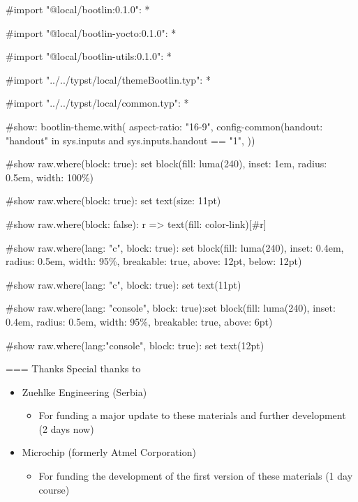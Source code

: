 #import "@local/bootlin:0.1.0": *

#import "@local/bootlin-yocto:0.1.0": *

#import "@local/bootlin-utils:0.1.0": *

#import "../../typst/local/themeBootlin.typ": *

#import "../../typst/local/common.typ": *

#show: bootlin-theme.with( aspect-ratio: "16-9", config-common(handout: "handout" in sys.inputs and sys.inputs.handout == "1", ))

#show raw.where(block: true): set block(fill: luma(240), inset: 1em, radius: 0.5em, width: 100\%)

#show raw.where(block: true): set text(size: 11pt)

#show raw.where(block: false): r => text(fill: color-link)[#r]

#show raw.where(lang: "c", block: true): set block(fill: luma(240), inset: 0.4em, radius: 0.5em, width: 95\%, breakable: true, above: 12pt, below: 12pt)

#show raw.where(lang: "c", block: true): set text(11pt)

#show raw.where(lang: "console", block: true):set block(fill: luma(240), inset: 0.4em, radius: 0.5em, width: 95\%, breakable: true, above: 6pt)

#show raw.where(lang:"console", block: true): set text(12pt)

=== Thanks
   Special thanks to
   \begin{itemize}
     \item Zuehlke Engineering (Serbia)
     \begin{itemize}
	   \item For funding a major update to these materials and
           further development (2 days now)
     \end{itemize}
     \item Microchip (formerly Atmel Corporation)
     \begin{itemize}
	   \item For funding the development of the first version of
           these materials (1 day course)
     \end{itemize}
   \end{itemize}

